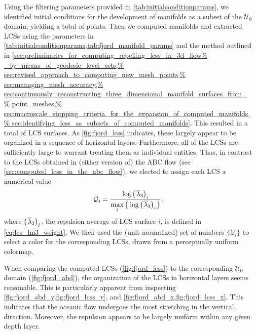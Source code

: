 Using the filtering parameters provided in \cref{tab:initialconditionparams},
we identified initial conditions for the development of manifolds as a subset
of the $\mathcal{U}_{0}$ domain; yielding a total of  points.
Then we computed manifolds and extracted LCSs using the parameters
in \cref{tab:initialconditionparams,tab:fjord_manifold_params} and the method
outlined in \cref{sec:preliminaries_for_computing_repelling_lcss_in_3d_flow%
    _by_means_of_geodesic_level_sets,%
    sec:revised_approach_to_computing_new_mesh_points,%
    sec:managing_mesh_accuracy,%
    sec:continuously_reconstructing_three_dimensional_manifold_surfaces_from_%
    point_meshes,%
    sec:macroscale_stopping_criteria_for_the_expansion_of_computed_manifolds,%
    sec:identifying_lcss_as_subsets_of_computed_manifolds}. This resulted in
a total of  LCS surfaces. As \cref{fig:fjord_lcss} indicates,
these largely appear to be organized in a sequence of horizontal layers.
Furthermore, all of the LCSs are sufficiently large to warrant treating them
as individual entities. Thus, in contrast to the LCSs obtained in (either
version of) the ABC flow (see \cref{sec:computed_lcss_in_the_abc_flow}), we
elected to assign each LCS a numerical value
\begin{equation}
    \label{eq:fjord_lcs_colorscaling}
    \mathcal{Q}_{i} = %
    \frac{\log{{\big({\mkern2mu}\overline{\lambda}_{3}\big)}_{i}}}%
    {\max\limits_{i}%
    \big\{\log{{\big({\mkern2mu}\overline{\lambda}_{3}\big)}_{i}}\big\}},
\end{equation}
where ${\big({\mkern2mu}\overline{\lambda}_{3}}\big)_{i}$, the repulsion
average of LCS surface $i$, is defined in \cref{eq:lcs_lm3_weight}. We then
used the (unit normalized) set of numbers $\big\{\mathcal{Q}_{i}\big\}$ to
select a color for the corresponding LCSs, drawn from a perceptually uniform
colormap.





When comparing the computed LCSs (\cref{fig:fjord_lcss}) to the corresponding
$\mathcal{U}_{0}$ domain (\cref{fig:fjord_abd}), the organization of
the LCSs in horizontal layers seems reasonable. This is particularly apparent
from inspecting \cref{fig:fjord_abd_y,fig:fjord_lcss_y}, and
\cref{fig:fjord_abd_x,fig:fjord_lcss_x}. This indicates that the oceanic
flow undergoes the most stretching in the vertical direction. Moreover, the
repulsion appears to be largely uniform within any given depth layer.

